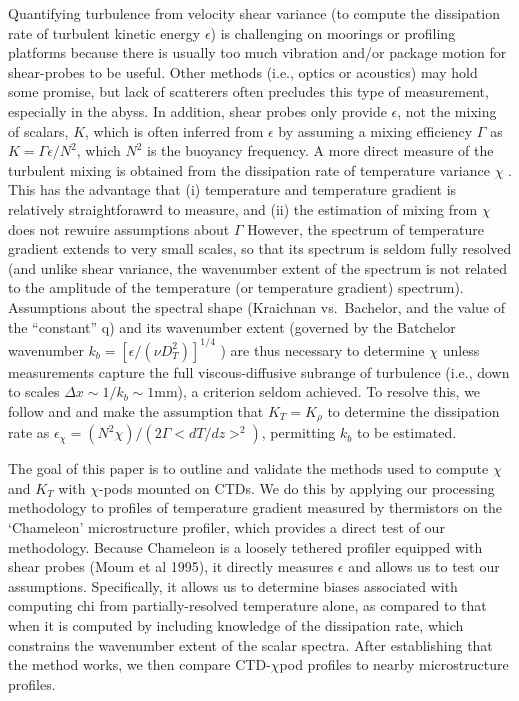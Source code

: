 \documentclass{ametsoc}
\begin{document}
Quantifying turbulence from velocity shear variance (to compute the dissipation rate of turbulent kinetic energy $\epsilon$) is challenging on moorings or profiling platforms because there is usually too much vibration and/or package motion for shear-probes to be useful. Other methods (i.e., optics or acoustics) may hold some promise, but lack of scatterers often precludes this type of measurement, especially in the abyss.  In addition, shear probes only provide $\epsilon$, not the mixing of scalars, $K$, which is often inferred from $\epsilon$ by assuming a mixing efficiency $\Gamma$ \citep{osborn80} as $K=\Gamma \epsilon / N^{2}$, which $N^2$ is the buoyancy frequency.  A more direct measure of the turbulent mixing is obtained from the dissipation rate of temperature variance $\chi$ \citep{osborncox72}.  This has the advantage that (i) temperature and temperature gradient is relatively straightforawrd to measure, and (ii) the estimation of mixing from $\chi$ does not rewuire assumptions about $\Gamma$   However, the spectrum of temperature gradient extends to very small scales, so that its spectrum is seldom fully resolved (and unlike shear variance, the wavenumber extent of the spectrum is not related to the amplitude of the temperature (or temperature gradient) spectrum). Assumptions about the spectral shape (Kraichnan vs.\ Bachelor, and the value of the ``constant'' q) and its wavenumber extent (governed by the Batchelor wavenumber $k_b=[\epsilon/(\nu D_{T}^{2})]^{1/4}$  \citep{batchelor59}) are thus necessary to determine $\chi$ unless measurements capture the full viscous-diffusive subrange of turbulence (i.e., down to scales $\Delta x \sim 1/k_b \sim 1$mm), a criterion seldom achieved.  To resolve this, we follow \cite{alfordpinkel00b} and \cite{moumnash09} and make the assumption that $K_T=K_{\rho}$ to determine the dissipation rate as $\epsilon_{\chi}=(N^2\chi)/(2\Gamma <dT/dz>^2)$, permitting $k_b$ to be estimated. 


The goal of this paper is to outline and validate the methods used to compute $\chi$ and $K_T$ with $\chi$-pods mounted on CTDs.  We do this by applying our processing methodology to profiles of temperature gradient measured by thermistors on the `Chameleon' microstructure profiler, which provides a direct test of our methodology.  Because Chameleon is a loosely tethered profiler equipped with shear probes (Moum et al 1995), it directly measures $\epsilon$ and allows us to test our assumptions.  Specifically, it allows us to determine biases associated with computing chi from partially-resolved temperature alone, as compared to that when it is computed by including knowledge of the dissipation rate, which constrains the wavenumber extent of the scalar spectra.   After establishing that the method works, we then compare CTD-$\chi$pod profiles to nearby microstructure profiles.%
\end{document}
